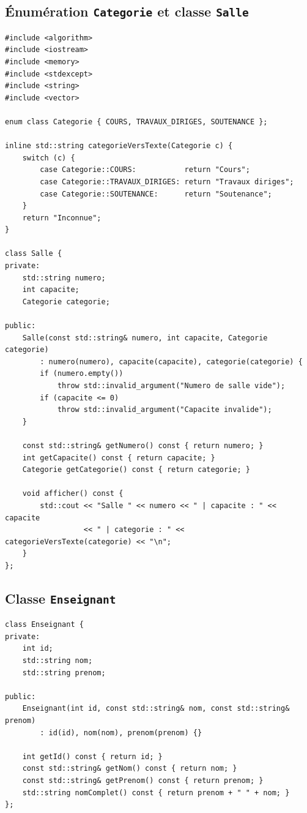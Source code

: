 \documentclass[12pt,a4paper]{report}
\begin{document}
\subsection{Énumération \texttt{Categorie} et classe \texttt{Salle}}
\begin{lstlisting}[style=cppstyle]
#include <algorithm>
#include <iostream>
#include <memory>
#include <stdexcept>
#include <string>
#include <vector>

enum class Categorie { COURS, TRAVAUX_DIRIGES, SOUTENANCE };

inline std::string categorieVersTexte(Categorie c) {
    switch (c) {
        case Categorie::COURS:           return "Cours";
        case Categorie::TRAVAUX_DIRIGES: return "Travaux diriges";
        case Categorie::SOUTENANCE:      return "Soutenance";
    }
    return "Inconnue";
}

class Salle {
private:
    std::string numero;
    int capacite;
    Categorie categorie;

public:
    Salle(const std::string& numero, int capacite, Categorie categorie)
        : numero(numero), capacite(capacite), categorie(categorie) {
        if (numero.empty())
            throw std::invalid_argument("Numero de salle vide");
        if (capacite <= 0)
            throw std::invalid_argument("Capacite invalide");
    }

    const std::string& getNumero() const { return numero; }
    int getCapacite() const { return capacite; }
    Categorie getCategorie() const { return categorie; }

    void afficher() const {
        std::cout << "Salle " << numero << " | capacite : " << capacite
                  << " | categorie : " << categorieVersTexte(categorie) << "\n";
    }
};
\end{lstlisting}

\subsection{Classe \texttt{Enseignant}}
\begin{lstlisting}[style=cppstyle]
class Enseignant {
private:
    int id;
    std::string nom;
    std::string prenom;

public:
    Enseignant(int id, const std::string& nom, const std::string& prenom)
        : id(id), nom(nom), prenom(prenom) {}

    int getId() const { return id; }
    const std::string& getNom() const { return nom; }
    const std::string& getPrenom() const { return prenom; }
    std::string nomComplet() const { return prenom + " " + nom; }
};
\end{lstlisting}
\end{document}
